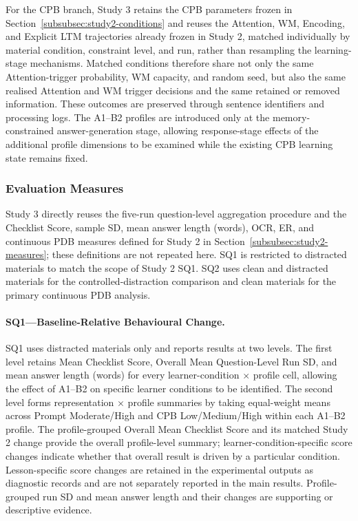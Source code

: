 For the CPB branch, Study 3 retains the CPB parameters frozen in Section~\ref{subsubsec:study2-conditions} and reuses the Attention, WM, Encoding, and Explicit LTM trajectories already frozen in Study 2, matched individually by material condition, constraint level, and run, rather than resampling the learning-stage mechanisms. Matched conditions therefore share not only the same Attention-trigger probability, WM capacity, and random seed, but also the same realised Attention and WM trigger decisions and the same retained or removed information. These outcomes are preserved through sentence identifiers and processing logs. The A1--B2 profiles are introduced only at the memory-constrained answer-generation stage, allowing response-stage effects of the additional profile dimensions to be examined while the existing CPB learning state remains fixed.

\subsubsection{Evaluation Measures}
\label{subsubsec:study3-measures}

Study 3 directly reuses the five-run question-level aggregation procedure and the Checklist Score, sample SD, mean answer length (words), OCR, ER, and continuous PDB measures defined for Study 2 in Section~\ref{subsubsec:study2-measures}; these definitions are not repeated here. SQ1 is restricted to distracted materials to match the scope of Study 2 SQ1. SQ2 uses clean and distracted materials for the controlled-distraction comparison and clean materials for the primary continuous PDB analysis.

\paragraph{SQ1---Baseline-Relative Behavioural Change.}

SQ1 uses distracted materials only and reports results at two levels. The first level retains Mean Checklist Score, Overall Mean Question-Level Run SD, and mean answer length (words) for every learner-condition $\times$ profile cell, allowing the effect of A1--B2 on specific learner conditions to be identified. The second level forms representation $\times$ profile summaries by taking equal-weight means across Prompt Moderate/High and CPB Low/Medium/High within each A1--B2 profile. The profile-grouped Overall Mean Checklist Score and its matched Study 2 change provide the overall profile-level summary; learner-condition-specific score changes indicate whether that overall result is driven by a particular condition. Lesson-specific score changes are retained in the experimental outputs as diagnostic records and are not separately reported in the main results. Profile-grouped run SD and mean answer length and their changes are supporting or descriptive evidence.

